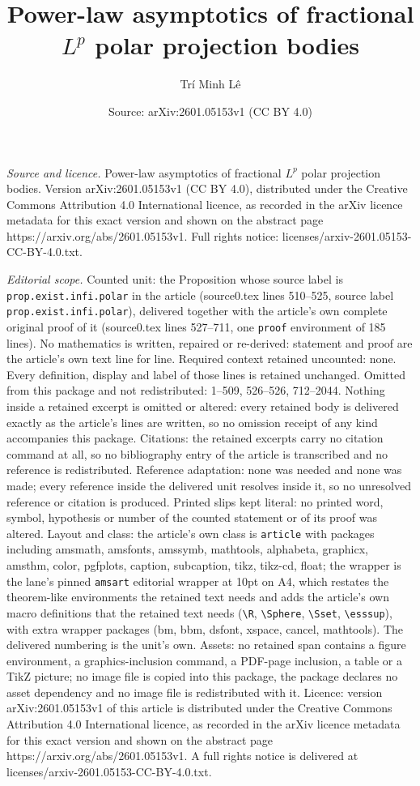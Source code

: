 \documentclass[10pt,a4paper]{amsart}
\title[Power-law asymptotics of fractional $L^p$ polar projection b]{Power-law asymptotics of fractional $L^p$ polar projection bodies}
\author{Tr\'i Minh L\^e}
\date{Source: arXiv:2601.05153v1 (CC BY 4.0)}
\begin{document}
\maketitle

\noindent\emph{Source and licence.} Power-law asymptotics of fractional $L^p$ polar projection bodies. Version arXiv:2601.05153v1 (CC BY 4.0), distributed under the Creative Commons Attribution 4.0 International licence, as recorded in the arXiv licence metadata for this exact version and shown on the abstract page https://arxiv.org/abs/2601.05153v1. Full rights notice: licenses/arxiv-2601.05153-CC-BY-4.0.txt.\par\smallskip

\noindent\textit{Editorial scope.} Counted unit: the Proposition whose source label is \texttt{prop.exist.infi.polar} in the article (source0.tex lines 510--525, source label \texttt{prop.exist.infi.polar}), delivered together with the article's own complete original proof of it (source0.tex lines 527--711, one \texttt{proof} environment of 185 lines). No mathematics is written, repaired or re-derived: statement and proof are the article's own text line for line. Required context retained uncounted: none. Every definition, display and label of those lines is retained unchanged. Omitted from this package and not redistributed: 1--509, 526--526, 712--2044. Nothing inside a retained excerpt is omitted or altered: every retained body is delivered exactly as the article's lines are written, so no omission receipt of any kind accompanies this package. Citations: the retained excerpts carry no citation command at all, so no bibliography entry of the article is transcribed and no reference is redistributed. Reference adaptation: none was needed and none was made; every reference inside the delivered unit resolves inside it, so no unresolved reference or citation is produced. Printed slips kept literal: no printed word, symbol, hypothesis or number of the counted statement or of its proof was altered. Layout and class: the article's own class is \texttt{article} with packages including amsmath, amsfonts, amssymb, mathtools, alphabeta, graphicx, amsthm, color, pgfplots, caption, subcaption, tikz, tikz-cd, float; the wrapper is the lane's pinned \texttt{amsart} editorial wrapper at 10pt on A4, which restates the theorem-like environments the retained text needs and adds the article's own macro definitions that the retained text needs (\texttt{\textbackslash R}, \texttt{\textbackslash Sphere}, \texttt{\textbackslash Sset}, \texttt{\textbackslash esssup}), with extra wrapper packages (bm, bbm, dsfont, xspace, cancel, mathtools). The delivered numbering is the unit's own. Assets: no retained span contains a figure environment, a graphics-inclusion command, a PDF-page inclusion, a table or a TikZ picture; no image file is copied into this package, the package declares no asset dependency and no image file is redistributed with it. Licence: version arXiv:2601.05153v1 of this article is distributed under the Creative Commons Attribution 4.0 International licence, as recorded in the arXiv licence metadata for this exact version and shown on the abstract page https://arxiv.org/abs/2601.05153v1. A full rights notice is delivered at licenses/arxiv-2601.05153-CC-BY-4.0.txt. 
\end{document}
